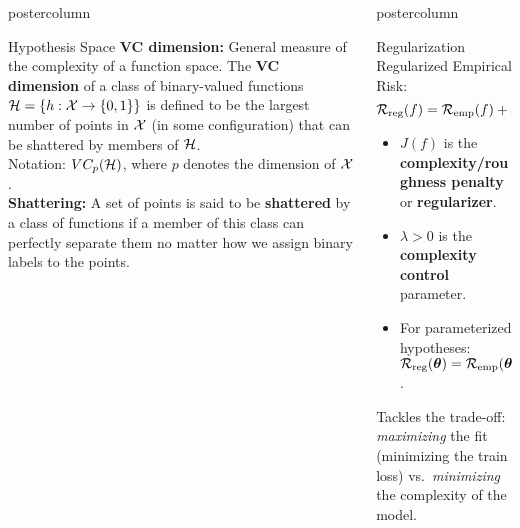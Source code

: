 \documentclass{beamer}
\newlength{\columnheight} %
\begin{document}
\begin{frame}[fragile]{}
\begin{columns}
\begin{column}{.31\textwidth}
\begin{beamercolorbox}[center]{postercolumn}
\begin{minipage}{.98\textwidth}
{\begin{myblock}{Hypothesis Space}
	\textbf{VC dimension:} General measure of the complexity of a function space.
	The \textbf{VC dimension} of a class of binary-valued functions $\mathcal{H} = \{h: \mathcal{X} \to \{0, 1\}\}$ is defined to be the largest number of points in $\mathcal{X}$ (in some configuration) that can be shattered by members of $\mathcal{H}$. \\
	Notation: $VC_p(\mathcal{H})$, where $p$ denotes the dimension of $\mathcal{X}$.\\
	\textbf{Shattering:} A set of points is said to be \textbf{shattered} by a class of functions if  a member of this class can perfectly separate them no matter how we assign binary labels to the points.
\end{myblock}\vfill
				}
			\end{minipage}
		\end{beamercolorbox}
	\end{column}
	\begin{column}{.31\textwidth}
		\begin{beamercolorbox}[center]{postercolumn}
			\begin{minipage}{.98\textwidth}
				\parbox[t][\columnheight]{\textwidth}{
\begin{myblock}{Regularization}  
%
	Regularized Empirical Risk:
	$$
	\mathcal{R}_{\text{reg}}(f) = \mathcal{R}_{\text{emp}}(f) + \lambda \cdot J(f)  
	$$
	\begin{itemize}
		\setlength{\itemindent}{+.3in}
		\item $J(f)$ is the \textbf{complexity/roughness penalty} or \textbf{regularizer}.
		\item $\lambda > 0$ is the \textbf{complexity control} parameter. 
		\item For parameterized hypotheses: $\mathcal{R}_{\text{reg}}(\bm{\theta}) = \mathcal{R}_{\text{emp}}(\bm{\theta}) + \lambda \cdot J(\bm{\theta})$. 
	\end{itemize}
	Tackles the trade-off: \emph{maximizing} the fit (minimizing the train loss) vs.\ \emph{minimizing} the complexity of the model. \\
	

\end{myblock}}
\end{minipage}
\end{beamercolorbox}
\end{column}
\end{columns}
\end{frame}
\end{document}
